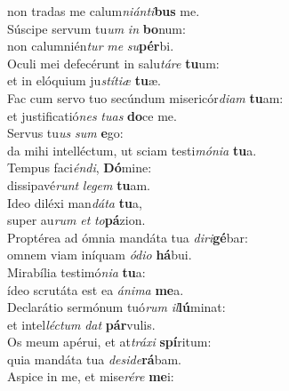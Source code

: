 \oddverse non tradas me calum\textit{ni}\textit{án}\textit{ti}\textbf{bus} me.\\
\evenverse Súscipe servum tu\textit{um} \textit{in} \textbf{bo}num:~\*\\
\evenverse non calumnién\textit{tur} \textit{me} \textit{su}\textbf{pér}bi.\\
\oddverse Oculi mei defecérunt in salu\textit{tá}\textit{re} \textbf{tu}um:~\*\\
\oddverse et in elóquium ju\textit{stí}\textit{ti}\textit{æ} \textbf{tu}æ.\\
\evenverse Fac cum servo tuo secúndum misericór\textit{di}\textit{am} \textbf{tu}am:~\*\\
\evenverse et justificatió\textit{nes} \textit{tu}\textit{as} \textbf{do}ce me.\\
\oddverse Servus tu\textit{us} \textit{sum} \textbf{e}go:~\*\\
\oddverse da mihi intelléctum, ut sciam testi\textit{mó}\textit{ni}\textit{a} \textbf{tu}a.\\
\evenverse Tempus faci\textit{én}\textit{di}, \textbf{Dó}mine:~\*\\
\evenverse dissipavé\textit{runt} \textit{le}\textit{gem} \textbf{tu}am.\\
\oddverse Ideo diléxi man\textit{dá}\textit{ta} \textbf{tu}a,~\*\\
\oddverse super au\textit{rum} \textit{et} \textit{to}\textbf{pá}zion.\\
\evenverse Proptérea ad ómnia mandáta tua \textit{di}\textit{ri}\textbf{gé}bar:~\*\\
\evenverse omnem viam iníquam \textit{ó}\textit{di}\textit{o} \textbf{há}bui.\\
\oddverse Mirabília testimó\textit{ni}\textit{a} \textbf{tu}a:~\*\\
\oddverse ídeo scrutáta est ea \textit{á}\textit{ni}\textit{ma} \textbf{me}a.\\
\evenverse Declarátio sermónum tuó\textit{rum} \textit{il}\textbf{lú}minat:~\*\\
\evenverse et intel\textit{lé}\textit{ctum} \textit{dat} \textbf{pár}vulis.\\
\oddverse Os meum apérui, et at\textit{trá}\textit{xi} \textbf{spí}ritum:~\*\\
\oddverse quia mandáta tua \textit{de}\textit{si}\textit{de}\textbf{rá}bam.\\
\evenverse Aspice in me, et mise\textit{ré}\textit{re} \textbf{me}i:~\*\\
